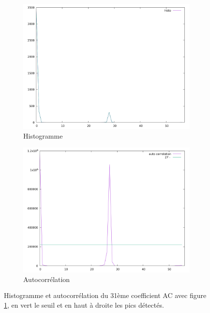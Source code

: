 \documentclass[utf8,final]{stageM2R} %
\begin{document}
\begin{figure}
  \begin{subfigure}{.5\textwidth}
    \centering
    \includegraphics[width=\linewidth]{images/histos/histo31}
    \caption{Histogramme}
  \end{subfigure}
  \begin{subfigure}{.5\textwidth}
    \centering
    \includegraphics[width=\linewidth]{images/histos/autocorrelation31}
    \caption{Autocorrélation}
    \label{fig:histo31_auto}
  \end{subfigure}
  \caption{Histogramme et autocorrélation du 31ème coefficient AC avec figure \ref{fig:histo31_auto}, en vert le seuil et en haut à droite les pics détectés.}
  \label{fig:histo31}
\end{figure}
\end{document}
